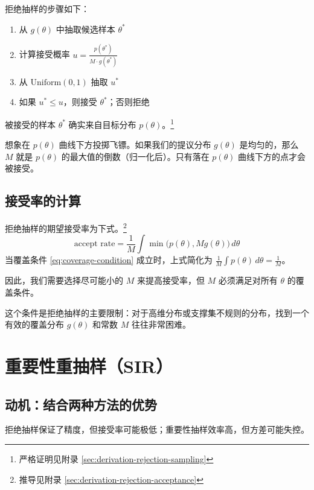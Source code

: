 拒绝抽样的步骤如下：
\begin{enumerate}
  \item 从 $g(\theta)$ 中抽取候选样本 $\theta^*$
  \item 计算接受概率 $u = \frac{p(\theta^*)}{M \cdot g(\theta^*)}$
  \item 从 $\mathrm{Uniform}(0,1)$ 抽取 $u^*$
  \item 如果 $u^* \leq u$，则接受 $\theta^*$；否则拒绝
\end{enumerate}

被接受的样本 $\theta^*$ 确实来自目标分布 $p(\theta)$。\footnote{严格证明见附录 \cref{sec:derivation-rejection-sampling}}

\begin{Example}[拒绝抽样的几何直观]
  想象在 $p(\theta)$ 曲线下方投掷飞镖。如果我们的提议分布 $g(\theta)$ 是均匀的，那么 $M$ 就是 $p(\theta)$ 的最大值的倒数（归一化后）。只有落在 $p(\theta)$ 曲线下方的点才会被接受。
\end{Example}

\subsection{接受率的计算}

拒绝抽样的期望接受率为下式。\footnote{推导见附录 \cref{sec:derivation-rejection-acceptance}}
\begin{equation}\label{eq:rejection-acceptance-rate}
\text{accept rate} = \frac{1}{M} \int \min\bigl(p(\theta), M g(\theta)\bigr) \, d\theta
\end{equation}
当覆盖条件 \cref{eq:coverage-condition} 成立时，上式简化为 $\frac{1}{M} \int p(\theta) \, d\theta = \frac{1}{M}$。

因此，我们需要选择尽可能小的 $M$ 来提高接受率，但 $M$ 必须满足对所有 $\theta$ 的覆盖条件。

这个条件是拒绝抽样的主要限制：对于高维分布或支撑集不规则的分布，找到一个有效的覆盖分布 $g(\theta)$ 和常数 $M$ 往往非常困难。

\section{重要性重抽样（SIR）}

\subsection{动机：结合两种方法的优势}

拒绝抽样保证了精度，但接受率可能极低；重要性抽样效率高，但方差可能失控。

